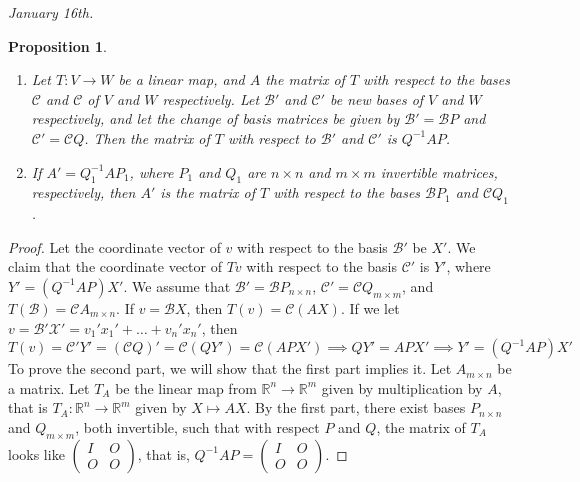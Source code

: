 \documentclass[15pt,a4paper]{book}
\newtheorem{proposition}[theorem]{Proposition}
\theoremstyle{definition}
\newcommand{\mc}[1]{\mathcal{#1}}
\newcommand{\R}{\mathbb{R}}
\begin{document}
\textit{January 16th.}
\begin{proposition}
    \begin{enumerate}
        \item Let $T:V \to W$ be a linear map, and $A$ the matrix of $T$ with respect to the bases $\mc{C}$ and $\mc{C}$ of $V$ and $W$ respectively. Let $\mc{B}'$ and $\mc{C}'$ be new bases of $V$ and $W$ respectively, and let the change of basis matrices be given by $\mc{B}' = \mc{B}P$ and $\mc{C}' = \mc{C}Q$. Then the matrix of $T$ with respect to $\mc{B}'$ and $\mc{C}'$ is $Q^{-1}AP$.
        \item If $A' = Q_{1}^{-1}AP_{1}$, where $P_{1}$ and $Q_{1}$ are $n \times n$ and $m \times m$ invertible matrices, respectively, then $A'$ is the matrix of $T$ with respect to the bases $\mc{B}P_{1}$ and $\mc{C}Q_{1}$.
    \end{enumerate}
    
\end{proposition}
\begin{proof}
    Let the coordinate vector of $v$ with respect to the basis $\mc{B}'$ be $X'$. We claim that the coordinate vector of $Tv$ with respect to the basis $\mc{C}'$ is $Y'$, where $Y' = (Q^{-1}AP)X'$. We assume that $\mc{B}' = \mc{B}P_{n \times n}$, $\mc{C}' = \mc{C}Q_{m \times m}$, and $T(\mc{B}) = \mc{C}A_{m \times n}$. If $v = \mc{B}X$, then $T(v) = \mc{C}(AX)$. If we let $v = \mc{B}'\mc{X}' = v_{1}'x_{1}' + \ldots + v_{n}'x_{n}'$, then
    \begin{equation}
        T(v) = \mc{C}'Y' = (\mc{C}Q)' = \mc{C}(QY') = \mc{C}(APX') \implies QY' = APX' \implies Y' = (Q^{-1}AP)X'
    \end{equation}
    To prove the second part, we will show that the first part implies it. Let $A_{m \times n}$ be a matrix. Let $T_{A}$ be the linear map from $\R^{n} \to \R^{m}$ given by multiplication by $A$, that is $T_{A} : \R^{n} \to \R^{m}$ given by $X \mapsto AX$. By the first part, there exist bases $P_{n \times n}$ and $Q_{m \times m}$, both invertible, such that with respect $P$ and $Q$, the matrix of $T_{A}$ looks like $\begin{pmatrix}
        I & O \\ O & O
    \end{pmatrix}$, that is, $Q^{-1}AP = \begin{pmatrix}
        I & O \\ O & O
    \end{pmatrix}$.
\end{proof}
\end{document}
